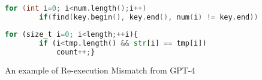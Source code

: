 \begin{figure}
    \centering
\begin{minipage}{0.48\textwidth}
  \begin{tcolorbox}[title= \footnotesize Original source code]
    \begin{lstlisting}[language=C++]
    for (int i=0; i<num.length();i++)
        if(find(key.begin(), key.end(), num(i) != key.end)) out+=1;
    \end{lstlisting}
  \end{tcolorbox}
\end{minipage}
\hfill
\begin{minipage}{0.5\textwidth}
  \begin{tcolorbox}[title= \footnotesize Code from decompilation]
    \begin{lstlisting}[language=Python]
    for (size_t i=0; i<length;++i){
        if (i<tmp.length() && str[i] == tmp[i])
            count++;}
    \end{lstlisting}
  \end{tcolorbox}
\end{minipage}
    \caption{An example of Re-execution Mismatch from GPT-4}
      \label{list:decompilation_result}
\end{figure}



